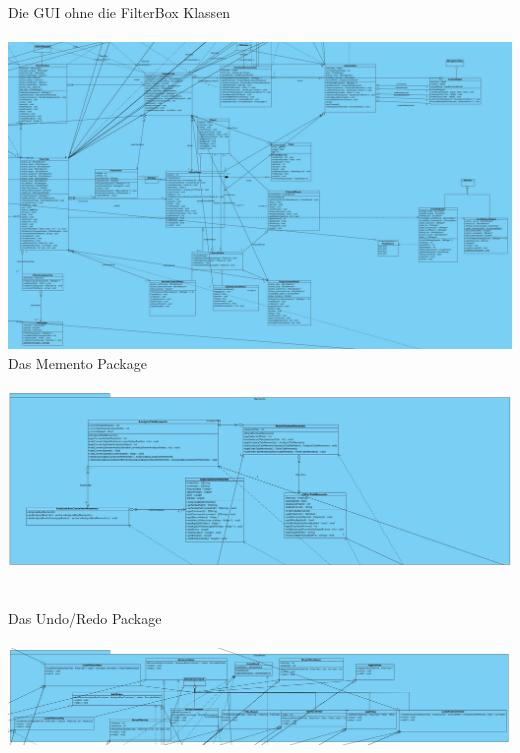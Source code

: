 \documentclass[twoside]{book}
\newcommand{\+}{\discretionary{\mbox{\scriptsize$\hookleftarrow$}}{}{}}
\begin{document}
\newpage
Die GUI ohne die FilterBox Klassen\\\\
{\centering\includegraphics[width=1\textwidth]{GUI_noFilter.jpg}}\\
\newpage
Das Memento Package\\\\
{\centering\includegraphics[width=1\textwidth]{Memento.jpg}}\\\\\\
Das Undo/Redo Package\\\\
{\centering\includegraphics[width=1\textwidth]{UndoRedo.jpg}}\\
\newpage
\end{document}
